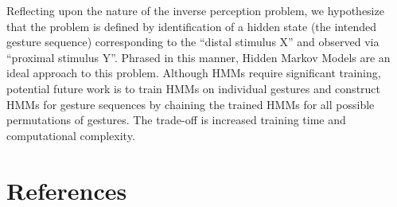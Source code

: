 \documentclass[twoside]{article}
\begin{document}
\begin{multicols}{2}
Reflecting upon the nature of the inverse perception problem, we hypothesize
that the problem is defined by identification of a hidden state (the intended
gesture sequence) corresponding to the ``distal stimulus X'' and observed via
``proximal stimulus Y''. Phrased in this manner, Hidden Markov Models are an
ideal approach to this problem. Although HMMs require significant training,
potential future work is to train HMMs on individual gestures and construct HMMs
for gesture sequences by chaining the trained HMMs for all possible permutations of
gestures. The trade-off is increased training time and computational complexity.
\section{References}

\begin{spacing}{0.9}
	
%
\begingroup
\renewcommand{\section}[2]{}%

\endgroup
\end{spacing}

\end{multicols}
\end{document}
